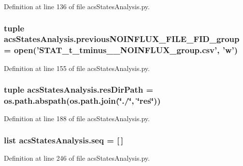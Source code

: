 Definition at line 136 of file acs\-States\-Analysis.\-py.

\hypertarget{a00099_a648b56a19ba8992cdb56d307ed22eb41}{
\subsubsection[{previous\-N\-O\-I\-N\-F\-L\-U\-X\-\_\-\-F\-I\-L\-E\-\_\-\-F\-I\-D\-\_\-group}]{\setlength{\rightskip}{0pt plus 5cm}tuple acs\-States\-Analysis.\-previous\-N\-O\-I\-N\-F\-L\-U\-X\-\_\-\-F\-I\-L\-E\-\_\-\-F\-I\-D\-\_\-group = open('S\-T\-A\-T\-\_\-t\-\_\-tminus\-\_\-\_\-\-N\-O\-I\-N\-F\-L\-U\-X\-\_\-group.\-csv', 'w')}}\label{a00099_a648b56a19ba8992cdb56d307ed22eb41}


Definition at line 155 of file acs\-States\-Analysis.\-py.

\hypertarget{a00099_ab3da7da39258338965b6eef645a913ee}{
\subsubsection[{res\-Dir\-Path}]{\setlength{\rightskip}{0pt plus 5cm}tuple acs\-States\-Analysis.\-res\-Dir\-Path = os.\-path.\-abspath(os.\-path.\-join(\char`\"{}./\char`\"{}, \char`\"{}res\char`\"{}))}}\label{a00099_ab3da7da39258338965b6eef645a913ee}


Definition at line 188 of file acs\-States\-Analysis.\-py.

\hypertarget{a00099_a22eec19fcd0da474a136cfe97438ae3b}{
\subsubsection[{seq}]{\setlength{\rightskip}{0pt plus 5cm}list acs\-States\-Analysis.\-seq = \mbox{[}$\,$\mbox{]}}}\label{a00099_a22eec19fcd0da474a136cfe97438ae3b}


Definition at line 246 of file acs\-States\-Analysis.\-py.

